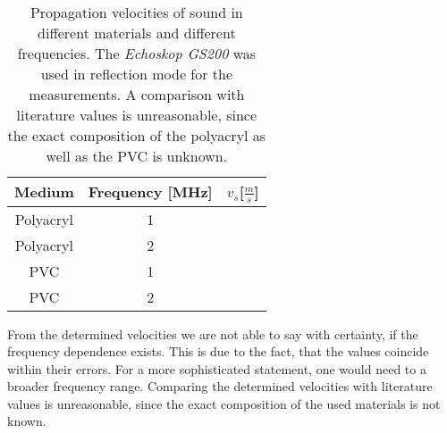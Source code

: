 \documentclass[a4paper,10pt,twocolumn]{article}
\begin{document}
    \begin{table}[htbp]          %
        \centering
        \begin{tabular*}{0.9\linewidth}{@{\extracolsep{\fill}}ccc}
            \hline
            \hline
            \rule[-7pt]{0pt}{23pt} Medium & Frequency [MHz]  &  $v_s$[$\frac{m}{s}$] 	 \\
            \hline
            \rule[-5pt]{0pt}{23pt}   Polyacryl & 1   &  \polyVelocityRuntimeMeasurementsOneMHz   	 \\
            \rule[-5pt]{0pt}{23pt}   Polyacryl & 2   & \polyVelocityRuntimeMeasurementsTwoMHz    	 \\
            \rule[-5pt]{0pt}{23pt}   PVC & 1  &   \PVCVelocityRuntimeMeasurementsOneMHz  	 \\
            \rule[-5pt]{0pt}{23pt}   PVC  & 2 &   \PVCVelocityRuntimeMeasurementsTwoMHz 	 \\
            \hline
            \hline
        \end{tabular*}
        \normalsize
        \caption[]{Propagation velocities of sound in different materials and different frequencies.
        The \textit{Echoskop GS200} was used in reflection mode for the measurements. A comparison with literature values is unreasonable, since
        the exact composition of the polyacryl as well as the PVC is unknown.}  %
        \label{tab:FittedExponent}                             %
    \end{table}
    From the determined velocities we are not able to say with certainty, if the frequency dependence exists.
    This is due to the fact, that the values coincide within their errors.
    For a more sophisticated statement, one would need to a broader frequency range.
    Comparing the determined velocities with literature values is unreasonable, since the exact composition of the used materials is not known.
    
\end{document}
